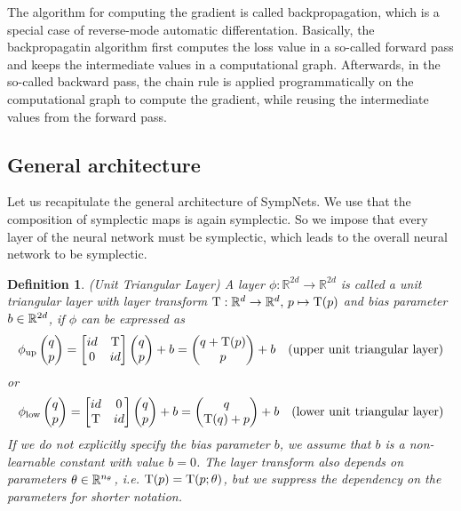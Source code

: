 \documentclass[twoside,a4paper]{article}
\newtheorem{definition}{Definition}
\begin{document}
The algorithm for computing the gradient is called backpropagation, which
is a special case of reverse-mode automatic differentation.
Basically, the backpropagatin algorithm first computes the loss value 
in a so-called forward pass
and keeps the intermediate values in a computational graph.
Afterwards, in the so-called backward pass, the chain rule is applied programmatically
on the computational graph to compute the gradient, while reusing the intermediate values
from the forward pass.

\subsection{General architecture}

Let us recapitulate the general architecture of SympNets.
We use that the composition of symplectic maps is again symplectic. So we impose that every
layer of the neural network must be symplectic, which leads to the overall neural network
to be symplectic.

\begin{definition}
	(Unit Triangular Layer) A layer $\phi : \mathbb{R}^{2d} \to \mathbb{R}^{2d}$ 
	is called a unit triangular layer with layer transform 
	$\mathrm{T} : \mathbb{R}^d \to \mathbb{R}^d,\, p \mapsto \mathrm{T}(p)$
	and bias parameter $b \in \mathbb{R}^{2d}$, if $\phi$ can be expressed as
	\begin{equation*}
		\phi_{\text{up}} \begin{pmatrix} q \\ p \end{pmatrix} = \begin{bmatrix} id & {\mathrm{T}} \\ 0 & id \end{bmatrix} \begin{pmatrix} q \\ p \end{pmatrix} + b
		= \begin{pmatrix}
			q + \mathrm{T}(p) \\
			p
		\end{pmatrix} + b \quad \text{(upper unit triangular layer)}
	\end{equation*}
	or
	\begin{equation*}
		\phi_{\text{low}} \begin{pmatrix} q \\ p \end{pmatrix} = \begin{bmatrix} id & 0 \\ {\mathrm{T}} & id \end{bmatrix} \begin{pmatrix} q \\ p \end{pmatrix} + b
		= \begin{pmatrix}
			q \\
			\mathrm{T}(q) + p
		\end{pmatrix} + b \quad \text{(lower unit triangular layer)}
	\end{equation*}
	If we do not explicitly specify the bias parameter $b$, we assume
	that $b$ is a non-learnable constant with value $b=0$. The layer transform
	also depends on parameters $\theta \in \mathbb{R}^{n_\theta}$, i.e.
	$\mathrm{T}(p) = \mathrm{T}(p;\theta)$, 
	but we suppress the dependency on the parameters for shorter notation.
\end{definition}
\end{document}
